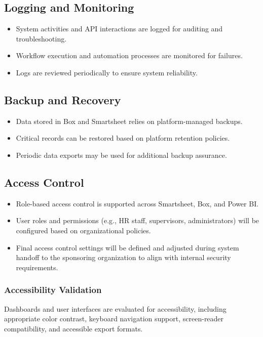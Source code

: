 \documentclass[12pt]{article}
\begin{document}
\subsection{Logging and Monitoring}
\begin{itemize}
    \item System activities and API interactions are logged for auditing and troubleshooting.
    \item Workflow execution and automation processes are monitored for failures.
    \item Logs are reviewed periodically to ensure system reliability.
\end{itemize}

\subsection{Backup and Recovery}
\begin{itemize}
    \item Data stored in Box and Smartsheet relies on platform-managed backups.
    \item Critical records can be restored based on platform retention policies.
    \item Periodic data exports may be used for additional backup assurance.
\end{itemize}

\subsection{Access Control}
\begin{itemize}
    \item Role-based access control is supported across Smartsheet, Box, and Power BI.
    \item User roles and permissions (e.g., HR staff, supervisors, administrators) will be configured based on organizational policies.
    \item Final access control settings will be defined and adjusted during system handoff to the sponsoring organization to align with internal security requirements.
\end{itemize}

\subsubsection{Accessibility Validation}

Dashboards and user interfaces are evaluated for accessibility, including appropriate color contrast, keyboard navigation support, screen-reader compatibility, and accessible export formats.
\end{document}
